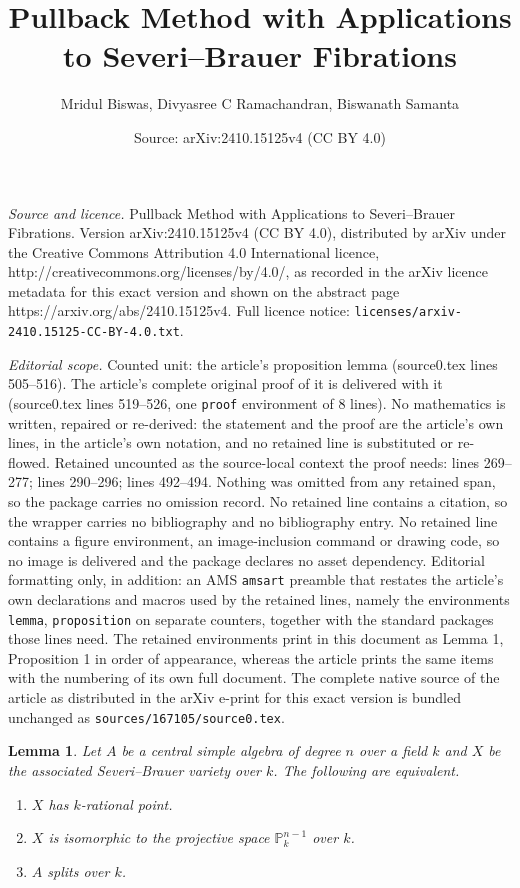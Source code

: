 \documentclass[10pt,a4paper]{amsart}
\title{Pullback Method with Applications to Severi--Brauer Fibrations}
\author{Mridul Biswas, Divyasree C Ramachandran, Biswanath Samanta}
\date{Source: arXiv:2410.15125v4 (CC BY 4.0)}
\newtheorem{lemma}{Lemma}
\renewcommand{\P}{{\mathbb P}}
\begin{document}
\maketitle

\noindent\emph{Source and licence.} Pullback Method with Applications to Severi--Brauer Fibrations. Version arXiv:2410.15125v4 (CC BY 4.0), distributed by arXiv under the Creative Commons Attribution 4.0 International licence, http://creativecommons.org/licenses/by/4.0/, as recorded in the arXiv licence metadata for this exact version and shown on the abstract page https://arxiv.org/abs/2410.15125v4. Full licence notice: \texttt{licenses/arxiv-2410.15125-CC-BY-4.0.txt}.\par\smallskip

\noindent\textit{Editorial scope.} Counted unit: the article's proposition lemma (source0.tex lines 505--516). The article's complete original proof of it is delivered with it (source0.tex lines 519--526, one \texttt{proof} environment of 8 lines). No mathematics is written, repaired or re-derived: the statement and the proof are the article's own lines, in the article's own notation, and no retained line is substituted or re-flowed.  Retained uncounted as the source-local context the proof needs: lines 269--277; lines 290--296; lines 492--494.  Nothing was omitted from any retained span, so the package carries no omission record.  No retained line contains a citation, so the wrapper carries no bibliography and no bibliography entry.  No retained line contains a figure environment, an image-inclusion command or drawing code, so no image is delivered and the package declares no asset dependency.  Editorial formatting only, in addition: an AMS \texttt{amsart} preamble that restates the article's own declarations and macros used by the retained lines, namely the environments \texttt{lemma}, \texttt{proposition} on separate counters, together with the standard packages those lines need.  The retained environments print in this document as Lemma 1, Proposition 1 in order of appearance, whereas the article prints the same items with the numbering of its own full document.  The complete native source of the article as distributed in the arXiv e-print for this exact version is bundled unchanged as \texttt{sources/167105/source0.tex}.
	\begin{lemma}\label{SB variety and rational point}
		Let $A$ be a central simple algebra of degree $n$ over a field $k$ and $X$ be the associated Severi--Brauer variety over $k$. The following are equivalent.
		\begin{enumerate}[label=\arabic*.]
			\item $X$ has $k$-rational point.
			\item $X$ is isomorphic to the projective space $\P^{n-1}_{k}$ over $k$.
			\item $A$ splits over $k$. 
		\end{enumerate}
		
	\end{lemma}
\end{document}
